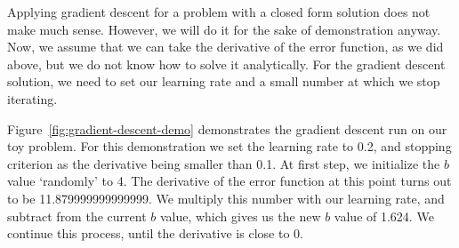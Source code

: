 Applying gradient descent for a problem with a closed form solution
does not make much sense.
However, we will do it for the sake of demonstration anyway.
Now, we assume that we can take the derivative of the error function,
as we did above, but we do not know how to solve it analytically.
For the gradient descent solution,
we need to set our learning rate
and a small number at which we stop iterating.

Figure~\ref{fig:gradient-descent-demo} demonstrates the 
gradient descent run on our toy problem.
For this demonstration we set the learning rate to \num{0.2},
and stopping criterion as the derivative being smaller than \num{0.1}.
At first step, we initialize the $b$ value `randomly' to \num{4}.
The derivative of the error function at this point
turns out to be \num{11.879999999999999}.
We multiply this number with our learning rate,
and subtract from the current $b$ value,
which gives us the new $b$ value of \num{1.624}.
We continue this process,
until the derivative is close to \num{0}.

